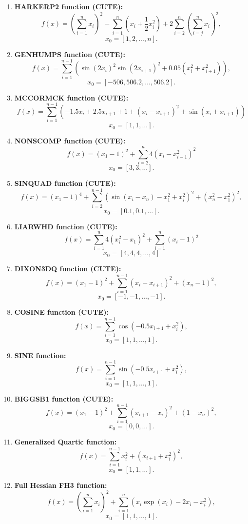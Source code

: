 \documentclass[10pt]{article}
\begin{document}
\begin{enumerate}
    \item \textbf{HARKERP2 function (CUTE):}
    \[
    f(x) = \left(\sum_{i=1}^{n} x_i \right)^2 - \sum_{i=1}^{n} ( x_i + \frac{1}{2} x_i^2 ) + 2 \sum_{i=2}^{n} \left(\sum_{i=j}^n x_i \right)^2,
    \]
    \[
    x_0 = \left[ 1, 2, ..., n \right].
    \]

    \item \textbf{GENHUMPS function (CUTE):}
    \[
    f(x) = \sum_{i=1}^{n-1} \left( \sin(2x_i)^2 \sin(2x_{i+1})^2 + 0.05 (x_i^2 + x_{i+1}^2) \right),
    \]
    \[
    x_0 = [-506, 506.2, \dots, 506.2].
    \]

    \item \textbf{MCCORMCK function (CUTE):}
    \[
    f(x) = \sum_{i=1}^{n-1} \left(-1.5x_i + 2.5 x_{i+1} + 1 + (x_i - x_{i+1})^2 + \sin(x_i + x_{i+1}) \right)
    \]
    \[
    x_0 = [1, 1, \dots].
    \]

    \item \textbf{NONSCOMP function (CUTE):}
    \[
    f(x) = (x_1 - 1)^2 + \sum_{i=2}^{n} 4 (x_i - x_{i-1}^2)^2 
    \]
    \[
    x_0 = [3, 3, \dots].
    \]

    \item \textbf{SINQUAD function (CUTE):}
    \[
    f(x) = (x_1 -1)^4 + \sum_{i=2}^{n-1} \left( \sin(x_i -x_n) - x_1^2  + x_i^2 \right)^2 + (x_n^2 - x_1^2)^2,
    \]
    \[
    x_0 = [0.1, 0.1, \dots].
    \]

    \item \textbf{LIARWHD function (CUTE):}
    \[
    f(x) = \sum_{i=1}^{n} 4\left( x_i^2 - x_1 \right)^2 + \sum_{i=1}^{n} \left( x_i - 1 \right)^2
    \]
    \[
    x_0 = [4, 4, 4, \dots, 4]
    \]

    \item \textbf{DIXON3DQ function (CUTE):}
    \[
    f(x) = (x_1 -1 )^2 + \sum_{i=1}^{n-1} \left( x_i - x_{i+1}\right)^2 + (x_n - 1)^2,
    \]
    \[
    x_0 = [-1, -1, \dots, -1].
    \]

    \item \textbf{COSINE function (CUTE):}
    \[
    f(x) = \sum_{i=1}^{n-1} \cos(-0.5 x_{i+1} + x_i^2),
    \]
    \[
    x_0 = [1, 1, \dots, 1].
    \]

    \item \textbf{SINE function:}
    \[
    f(x) = \sum_{i=1}^{n-1} \sin(-0.5 x_{i+1} + x_i^2),
    \]
    \[
    x_0 = [1, 1, \dots, 1].
    \]

    \item \textbf{BIGGSB1 function (CUTE):}
    \[
    f(x) = (x_1 - 1)^2 + \sum_{i=1}^{n-1} \left( x_{i+1} - x_i\right)^2 + (1 - x_n)^2,
    \]
    \[
    x_0 = [0, 0, \dots].
    \]

    \item \textbf{Generalized Quartic function:}
    \[
    f(x) = \sum_{i=1}^{n-1} x_i^2 + (x_{i+1} + x_i^2)^2,
    \]
    \[
    x_0 = [1, 1, \dots].
    \]

    \item \textbf{Full Hessian FH3 function:}
    \[
    f(x) = \left(\sum_{i=1}^{n}x_i \right)^2 + \sum_{i=1}^{n} (x_i\exp(x_i) - 2x_i - x_i^2),
    \]
    \[
    x_0 = [1, 1, \dots, 1].
    \]
\end{enumerate}
\end{document}
